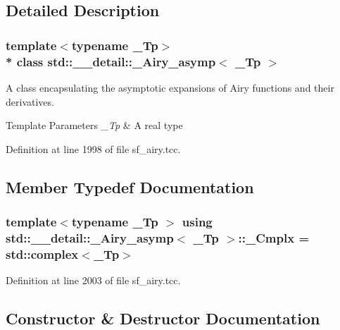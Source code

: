 \subsection{Detailed Description}
\subsubsection*{template$<$typename \+\_\+\+Tp$>$\\*
class std\+::\+\_\+\+\_\+detail\+::\+\_\+\+Airy\+\_\+asymp$<$ \+\_\+\+Tp $>$}

A class encapsulating the asymptotic expansions of Airy functions and their derivatives.


\begin{DoxyTemplParams}{Template Parameters}
{\em \+\_\+\+Tp} & A real type \\
\hline
\end{DoxyTemplParams}


Definition at line 1998 of file sf\+\_\+airy.\+tcc.



\subsection{Member Typedef Documentation}
\subsubsection[{\texorpdfstring{\+\_\+\+Cmplx}{_Cmplx}}]{\setlength{\rightskip}{0pt plus 5cm}template$<$typename \+\_\+\+Tp $>$ using {\bf std\+::\+\_\+\+\_\+detail\+::\+\_\+\+Airy\+\_\+asymp}$<$ \+\_\+\+Tp $>$\+::{\bf \+\_\+\+Cmplx} =  std\+::complex$<$\+\_\+\+Tp$>$}\hypertarget{classstd_1_1____detail_1_1__Airy__asymp_ae28f102423d34e78502ab6da42d67f50}{}\label{classstd_1_1____detail_1_1__Airy__asymp_ae28f102423d34e78502ab6da42d67f50}


Definition at line 2003 of file sf\+\_\+airy.\+tcc.



\subsection{Constructor \& Destructor Documentation}
